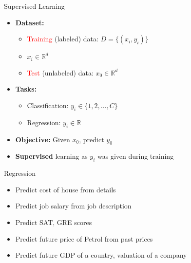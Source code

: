 \documentclass{beamer}
\newcommand{\hred}[1]{{\textcolor{red}{#1}}}
\begin{document}
\begin{frame}{Supervised Learning}
    \begin{itemize} 
        \item {\bf Dataset:}
        \begin{itemize}
            \item \hred{Training} (labeled) data: $D = \{ (x_i, y_i) \}$
            \item $x_i \in \mathbb{R}^d$
            \item \hred{Test} (unlabeled) data: $x_0 \in \mathbb{R}^d$  
        \end{itemize} 
        \item {\bf Tasks:}
        \begin{itemize}  
            \item Classification: $y_i \in \{1, 2, \ldots, C\}$ 
            \item Regression: $y_i \in \mathbb{R}$
        \end{itemize}
        \item {\bf Objective:} Given $x_0$, predict $y_0$
        \item {\bf Supervised} learning as $y_i$ was given during training
    \end{itemize} 
\end{frame}

\begin{frame}{Regression}
    \begin{itemize}
        \item Predict cost of house from details
        \item Predict job salary from job description
        \item Predict SAT, GRE scores
        \item Predict future price of Petrol from past prices
        \item Predict future GDP of a country, valuation of a company
    \end{itemize}
\end{frame}
\end{document}
